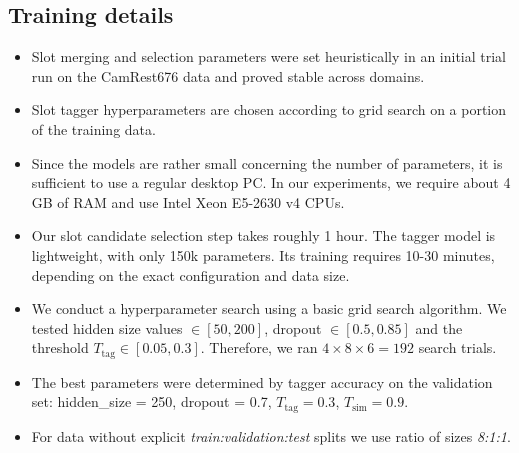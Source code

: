 \subsection{Training details}
\begin{itemize}
    \item Slot merging and selection parameters were set heuristically in an initial trial run on the CamRest676 data and proved stable across domains.
    \item Slot tagger hyperparameters are chosen according to grid search on a portion of the training data.
    \item Since the models are rather small concerning the number of parameters, it is sufficient to use a regular desktop PC. In our experiments, we require about 4 GB of RAM and use Intel Xeon E5-2630 v4 CPUs. 
    \item Our slot candidate selection step takes roughly 1 hour.
    The tagger model is lightweight, with only 150k parameters. Its training requires 10-30 minutes, depending on the exact configuration and data size.
    \item We conduct a hyperparameter search using a basic grid search algorithm. We tested hidden size values $\in [50,200]$, dropout $\in [0.5,0.85]$ and the threshold $T_{\text{tag}} \in [0.05,0.3]$. Therefore, we ran $4\times8\times6 = 192$ search trials.
    \item The best parameters were determined by tagger accuracy on the validation set: hidden\_size = 250, dropout = 0.7, $T_{\text{tag}} = 0.3$, $T_{\text{sim}} = 0.9$.
    \item For data without explicit \emph{train:validation:test} splits we use ratio of sizes \emph{8:1:1}.
\end{itemize}


